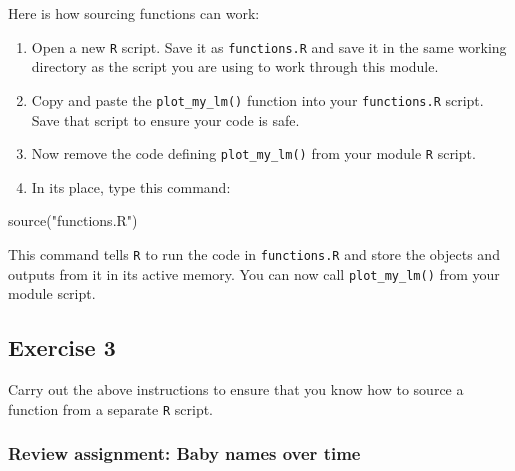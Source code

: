 \documentclass[
]{book}
\newenvironment{Shaded}{\begin{snugshade}}{\end{snugshade}}
\newcommand{\FunctionTok}[1]{\textcolor[rgb]{0.00,0.00,0.00}{#1}}
\newcommand{\NormalTok}[1]{#1}
\newcommand{\StringTok}[1]{\textcolor[rgb]{0.31,0.60,0.02}{#1}}
\begin{document}
Here is how sourcing functions can work:

\begin{enumerate}
\def\labelenumi{\arabic{enumi}.}
\item
  Open a new \texttt{R} script. Save it as \texttt{functions.R} and save it in the same working directory as the script you are using to work through this module.
\item
  Copy and paste the \texttt{plot\_my\_lm()} function into your \texttt{functions.R} script. Save that script to ensure your code is safe.
\item
  Now remove the code defining \texttt{plot\_my\_lm()} from your module \texttt{R} script.
\item
  In its place, type this command:
\end{enumerate}

\begin{Shaded}
\begin{Highlighting}[]
\FunctionTok{source}\NormalTok{(}\StringTok{"functions.R"}\NormalTok{)}
\end{Highlighting}
\end{Shaded}

This command tells \texttt{R} to run the code in \texttt{functions.R} and store the objects and outputs from it in its active memory. You can now call \texttt{plot\_my\_lm()} from your module script.

\hypertarget{exercise-3-2}{%
\subsection*{Exercise 3}\label{exercise-3-2}}

Carry out the above instructions to ensure that you know how to source a function from a separate \texttt{R} script.

\hypertarget{review-assignment-baby-names-over-time}{%
\subsubsection*{Review assignment: Baby names over time}\label{review-assignment-baby-names-over-time}}
\end{document}
